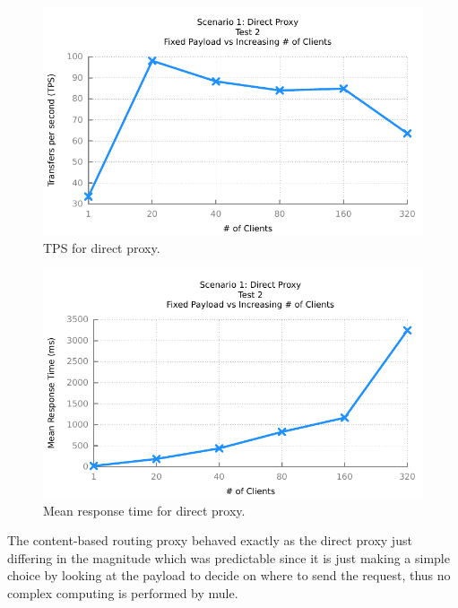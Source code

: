 \begin{figure}[htpb]
	\centerline{\includegraphics{img/proxy_fp_iu_tps}}
	\caption{TPS for direct proxy.}
	\label{fig:proxy-2-1}
\end{figure}

\begin{figure}[htpb]
	\centerline{\includegraphics{img/proxy_fp_iu_resp}}
	\caption{Mean response time for direct proxy.}
	\label{fig:proxy-2-2}
\end{figure}

The content-based routing proxy behaved exactly as the direct proxy just differing in the magnitude which was predictable since it is just making a simple choice by looking at the payload to decide on where to send the request, thus no complex computing is performed by mule.

